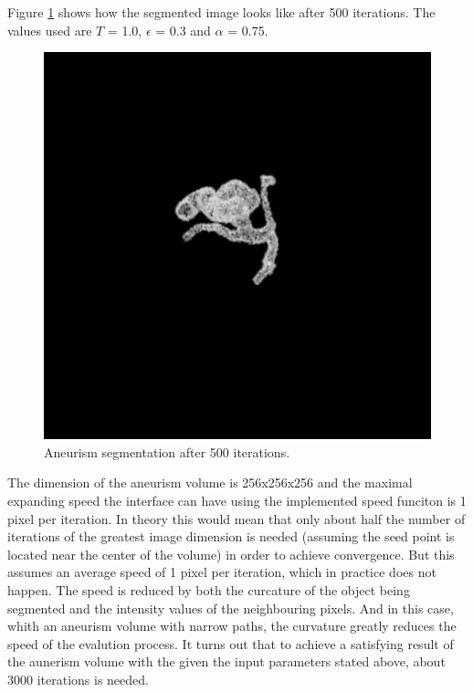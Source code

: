 Figure \ref{aneurism500iterations} shows how the segmented image looks like after 500 iterations. The values used are $T$ = 1.0, $\epsilon$ = 0.3 and $\alpha$ = 0.75. 
\begin{figure}[h!]
\centering
\includegraphics[width=.9\textwidth]{results/3D/aneurism_500_iterations}
\caption{Aneurism segmentation after 500 iterations.}
\label{aneurism500iterations}
\end{figure}
The dimension of the aneurism volume is 256x256x256 and the maximal expanding speed the interface can have using the implemented speed funciton is 1 pixel per iteration. In theory this would mean that only about half the number of iterations of the greatest image dimension is needed (assuming the seed point is located near the center of the volume) in order to achieve convergence. But this assumes an average speed of 1 pixel per iteration, which in practice does not happen. The speed is reduced by both the curcature of the object being segmented and the intensity values of the neighbouring pixels. And in this case, whith an aneurism volume with narrow paths, the curvature greatly reduces the speed of the evalution process. It turns out that to achieve a satisfying result of the aunerism volume with the given the input parameters stated above, about 3000 iterations is needed. 
